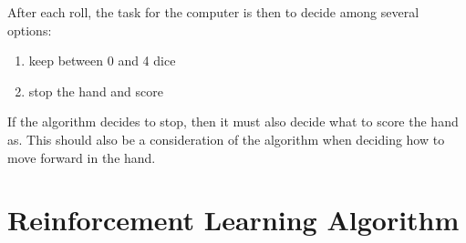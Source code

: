\documentclass[10pt, onecolumn]{article}
\begin{document}
After each roll, the task for the computer is then to decide among several options:
\begin{enumerate}
 \item keep between 0 and 4 dice
 \item stop the hand and score
\end{enumerate}

If the algorithm decides to stop, then it must also decide 
what to score the hand as. This should also be a consideration of the
algorithm when deciding how to move forward in the hand.



\section{Reinforcement Learning Algorithm}
\end{document}
